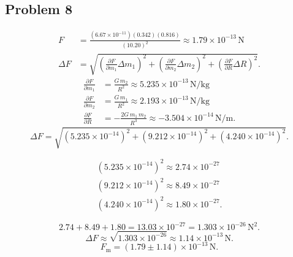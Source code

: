 
\subsection{Problem 8}

\begin{align*}
	F &= \frac{(6.67\times10^{-11})(0.342)(0.816)}{(10.20)^2} \approx 1.79\times10^{-13}\,\mathrm{N} \\
	\Delta F &= \sqrt{\left(\frac{\partial F}{\partial m_1}\Delta m_1\right)^2 + \left(\frac{\partial F}{\partial m_2}\Delta m_2\right)^2 + \left(\frac{\partial F}{\partial R}\Delta R\right)^2}
	.\end{align*}
\begin{align*}
	\frac{\partial F}{\partial m_1} &= \frac{G\,m_2}{R^2}\approx 5.235\times10^{-13}\,\mathrm{N/kg} \\
	\frac{\partial F}{\partial m_2} &= \frac{G\,m_1}{R^2}\approx 2.193\times10^{-13}\,\mathrm{N/kg} \\
	\frac{\partial F}{\partial R} &= -\frac{2G\,m_1\,m_2}{R^3}\approx -3.504\times10^{-14}\,\mathrm{N/m}
	.\end{align*}
\[
	\Delta F = \sqrt{(5.235\times10^{-14})^2 + (9.212\times10^{-14})^2 + (4.240\times10^{-14})^2}.
\]

\begin{align*}
	(5.235\times10^{-14})^2\approx 2.74\times10^{-27} \\
	(9.212\times10^{-14})^2\approx 8.49\times10^{-27} \\
	(4.240\times10^{-14})^2\approx 1.80\times10^{-27}
	.\end{align*}

\[
	2.74+8.49+1.80=13.03\times10^{-27}=1.303\times10^{-26}\,\mathrm{N^2}.
\]
\[
	\Delta F \approx \sqrt{1.303\times10^{-26}} \approx 1.14\times10^{-13}\,\mathrm{N}.
\]
\[
	F_{\mathrm{m}} = (1.79\pm1.14)\times10^{-13}\,\mathrm{N}.
\]
